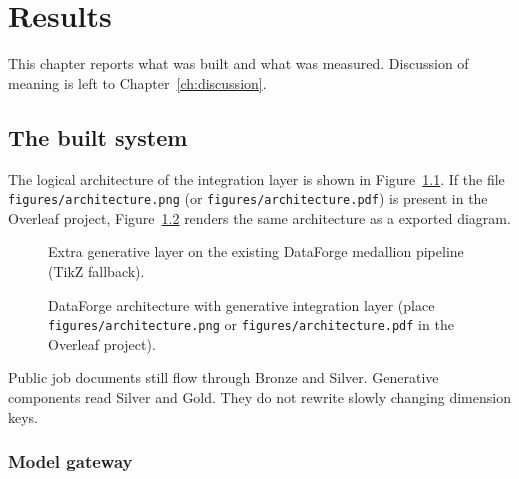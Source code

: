 \chapter{Results}
\label{ch:results}

This chapter reports what was built and what was measured. Discussion of meaning is left to Chapter~\ref{ch:discussion}.

\section{The built system}
\label{sec:artefact}

The logical architecture of the integration layer is shown in Figure~\ref{fig:arch}. If the file \texttt{figures/architecture.png} (or \texttt{figures/architecture.pdf}) is present in the Overleaf project, Figure~\ref{fig:arch-png} renders the same architecture as a exported diagram.

\begin{figure}[ht]
\centering
{}
\caption{Extra generative layer on the existing DataForge medallion pipeline (TikZ fallback).}
\label{fig:arch}
\end{figure}

\begin{figure}[ht]
\centering
{}
\caption{DataForge architecture with generative integration layer (place \texttt{figures/architecture.png} or \texttt{figures/architecture.pdf} in the Overleaf project).}
\label{fig:arch-png}
\end{figure}

Public job documents still flow through Bronze and Silver. Generative components read Silver and Gold. They do not rewrite slowly changing dimension keys.

\subsection{Model gateway}

